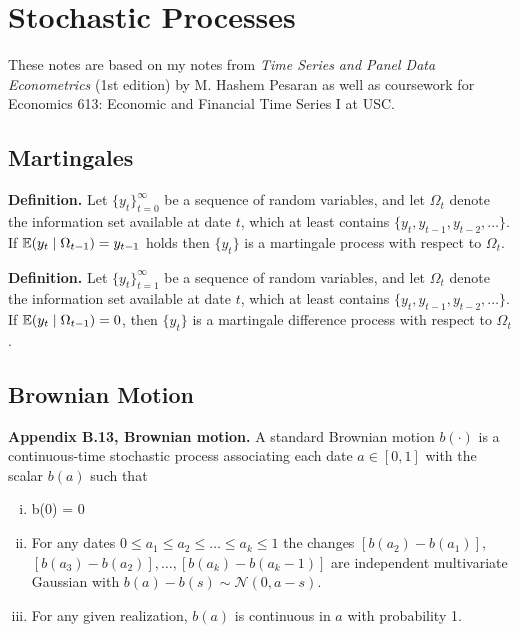 
\section{Stochastic Processes}

These notes are based on my notes from \textit{Time Series and Panel Data Econometrics} (1st edition) by M. Hashem Pesaran as well as coursework for Economics 613: Economic and Financial Time Series I at USC.

\subsection{Martingales}

\textbf{Definition.} Let \(\{y_t\}_{t=0}^\infty \) be a sequence of random variables, and let \(\Omega_t\) denote the information set available at date \(t\), which at least contains \(\{y_t, y_{t-1}, y_{t-2}, \ldots \}\). If \(\E(y_t \mid \Omega_{t-1}) = y_{t-1}\) holds then \(\{y_t\}\) is a martingale process with respect to \(\Omega_t\).

\textbf{Definition.} Let \(\{y_t\}_{t=1}^\infty \) be a sequence of random variables, and let \(\Omega_t\) denote the information set available at date \(t\), which at least contains \(\{y_t, y_{t-1}, y_{t-2}, \ldots \}\). If \(\E(y_t \mid \Omega_{t-1}) =0\), then \(\{y_t\}\) is a martingale difference process with respect to \(\Omega_t\).

\subsection{Brownian Motion}

%
\textbf{Appendix B.13, Brownian motion.} A standard Brownian motion \(b(\cdot)\) is a continuous-time stochastic process associating each date \(a \in [0, 1]\) with the scalar \(b(a)\) such that

\begin{enumerate}[(i)]

\item b(0) = 0

\item For any dates \(0 \leq a_1 \leq a_2 \leq \ldots \leq a_k \leq 1\) the changes \([b(a_2) - b(a_1)]\), \([b(a_3) - b(a_2)], \ldots, [b(a_k) - b(a_k - 1)]\) are independent multivariate Gaussian with \(b(a) - b(s) \sim \mathcal{N}(0, a -s)\). 

\item For any given realization, \(b(a)\) is continuous in \(a\) with probability 1.

\end{enumerate}

